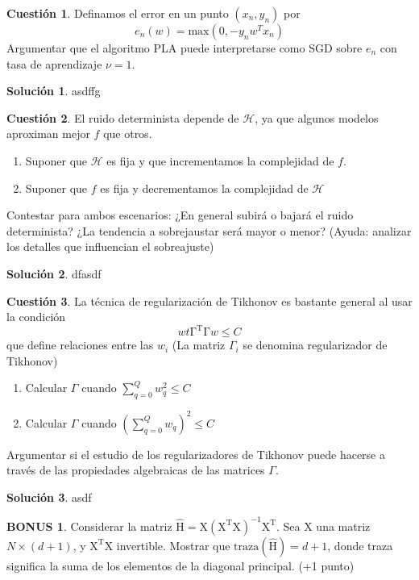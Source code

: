 \documentclass[a4paper, 11pt]{article}
\theoremstyle{definition}
\newtheorem{cuestion}{Cuestión}
\newtheorem*{solucion}{Solución}
\newtheorem*{bonus}{BONUS}
\begin{document}
  \begin{cuestion}
    Definamos el error en un punto $(x_n,y_n)$ por
      \[
      e_n(w)=\text{max}(0,-y_nw^Tx_n)
      \]
      Argumentar que el algoritmo PLA puede interpretarse como SGD sobre $e_n$ con tasa de aprendizaje $\nu=1$.
  \end{cuestion}

  \begin{solucion}
    asdffg
  \end{solucion}

  \begin{cuestion}
    El ruido determinista depende de $\mathcal{H}$, ya que algunos modelos aproximan mejor $f$ que otros.
    \begin{enumerate}
        \item Suponer que $\mathcal{H}$ es fija y que incrementamos la complejidad de $f$.
        \item Suponer que $ f$ es fija y decrementamos la complejidad de $\mathcal{H}$
    \end{enumerate}
    Contestar para ambos escenarios: ¿En general subirá o bajará el ruido determinista? ¿La tendencia a sobrejaustar será mayor o menor? (Ayuda: analizar los detalles que influencian el sobreajuste)
  \end{cuestion}

  \begin{solucion}
    dfasdf
  \end{solucion}


  \begin{cuestion}
    La técnica de regularización de Tikhonov es bastante general al usar la condición
    \[
    wt\mathrm{\Gamma^T\Gamma}w\leq C
    \]
    que define relaciones entre las $w_i$ (La matriz $\Gamma_i$ se denomina regularizador de Tikhonov)
    \begin{enumerate}
    \item Calcular $\Gamma$ cuando $\sum_{q=0}^Q w_q^2 \leq C$
    \item Calcular $\Gamma$ cuando $(\sum_{q=0}^Q w_q)^2 \leq C$
    \end{enumerate}
    Argumentar si el estudio de los regularizadores de Tikhonov puede hacerse a través de las propiedades algebraicas de las matrices $\Gamma$.
  \end{cuestion}

  \begin{solucion}
    asdf
  \end{solucion}

  \begin{bonus}
    Considerar la matriz $\hat{\mathrm{H}}=\mathrm{X(X^TX)^{-1}X^T}$. Sea $\mathrm{X}$ una matriz  $N\times (d+1)$, y $\mathrm{X^TX}$ invertible. Mostrar que $\mathrm{traza(\hat{H})}=d+1$, donde traza significa la suma de los elementos de la diagonal principal. (+1 punto)
  \end{bonus}
\end{document}
